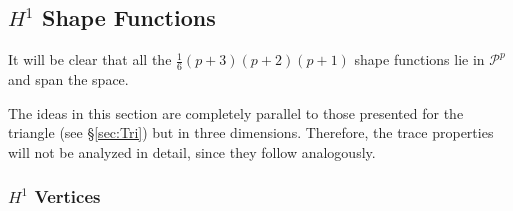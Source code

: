 
\subsection{\texorpdfstring{$H^1$}{H1} Shape Functions}
%

It will be clear that all the $\frac{1}{6}(p+3)(p+2)(p+1)$ shape functions lie in $\mathcal{P}^{p}$ and span the space.

The ideas in this section are completely parallel to those presented for the triangle (see \S\ref{sec:Tri}) but in three dimensions.
Therefore, the trace properties will not be analyzed in detail, since they follow analogously.

\subsubsection{\texorpdfstring{$H^1$}{H1} Vertices}

